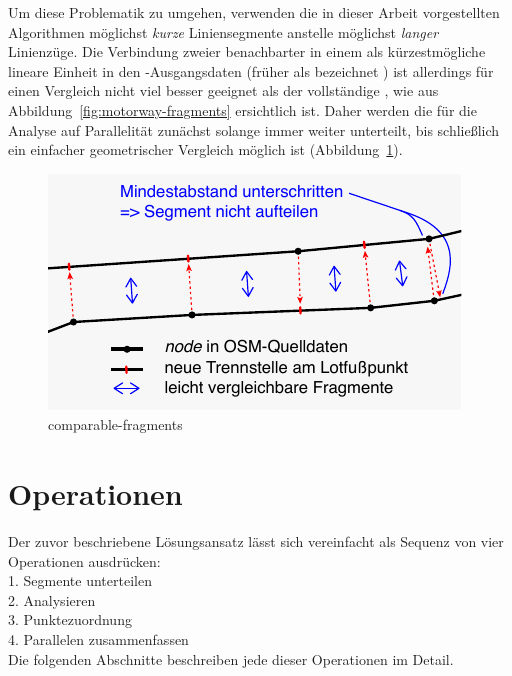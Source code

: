 \documentclass[../main/thesis.tex]{subfiles}
\begin{document}
Um diese Problematik zu umgehen, verwenden die in dieser Arbeit vorgestellten Algorithmen möglichst \emph{kurze} Liniensegmente anstelle möglichst \emph{langer} Linienzüge.
Die Verbindung zweier benachbarter  in einem  als kürzestmögliche lineare Einheit in den \osm-Ausgangsdaten (früher als  bezeichnet ) ist allerdings für einen Vergleich nicht viel besser geeignet als der vollständige %
, wie aus Abbildung~\ref{fig:motorway-fragments} ersichtlich ist.
Daher werden die  für die Analyse auf Parallelität zunächst solange immer weiter unterteilt, bis schließlich ein einfacher geometrischer Vergleich möglich ist (Abbildung~\ref{fig:comparable-fragments}).

\begin{figure}[ht]
    \centering
    \includegraphics[width=\ScaleIfNeeded]{../chapter4/comparable-fragments}
    \caption{comparable-fragments}\label{fig:comparable-fragments}
\end{figure}



\section{Operationen}

Der zuvor beschriebene Lösungsansatz lässt sich vereinfacht als Sequenz von vier Operationen ausdrücken:\\
1. Segmente unterteilen\\
2. Analysieren\\
3. Punktezuordnung\\
4. Parallelen zusammenfassen\\


Die folgenden Abschnitte beschreiben jede dieser Operationen im Detail.
\end{document}
